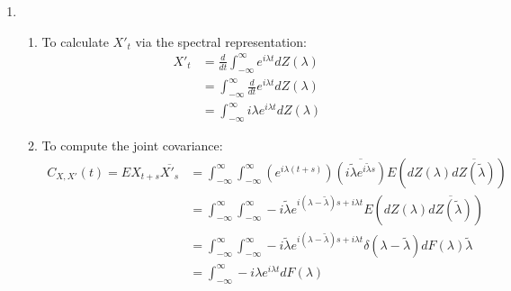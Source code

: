 \documentclass[12pt]{article}
\theoremstyle{plain}
\theoremstyle{definition}
\theoremstyle{remark}
\begin{document}
\begin{enumerate}
  \item %
    \begin{enumerate}
      \item %
        To calculate $X'_t$ via the spectral representation:
        \begin{align*}
          X'_t
            &=  \frac{d}{dt} \int^\infty_{-\infty} e^{i\lambda t} dZ(\lambda)\\
            &=  \int^\infty_{-\infty} \frac{d}{dt} e^{i\lambda t} dZ(\lambda)\\
            &=  \int^\infty_{-\infty} i\lambda e^{i\lambda t} dZ(\lambda)
        \end{align*}

      \item To compute the joint covariance:
        \begin{align*}
          C_{X,X'}(t) = EX_{t+s}\overline{X'_s}
            &= \int^\infty_{-\infty} \int^\infty_{-\infty}
            \left(e^{i\lambda (t+s)}\right)
            \overline{\left(i\tilde{\lambda} e^{i\tilde{\lambda} s}\right)}
            E(dZ(\lambda)\overline{dZ(\tilde{\lambda})}) \\
          &= \int^\infty_{-\infty} \int^\infty_{-\infty}
            -i\tilde{\lambda} e^{i(\lambda-\tilde{\lambda}) s +{i\lambda}t}
            E(dZ(\lambda)\overline{dZ(\tilde{\lambda})}) \\
          &= \int^\infty_{-\infty} \int^\infty_{-\infty}
            -i\tilde{\lambda} e^{i(\lambda-\tilde{\lambda}) s +{i\lambda}t}
            \delta(\lambda-\tilde{\lambda}) dF(\lambda)\tilde{\lambda}\\
          &= \int^\infty_{-\infty} 
            -i{\lambda} e^{{i\lambda}t}
            dF(\lambda)
        \end{align*}

    \end{enumerate}

\end{enumerate}



\end{document}
